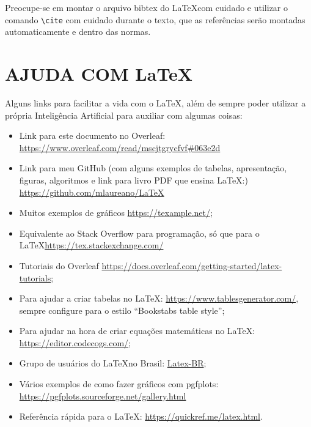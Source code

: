 \documentclass[12pt, openright, oneside, a4paper, english, brazilian]{abntex2}
\begin{document}
	Preocupe-se em montar o arquivo bibtex do \LaTeX com cuidado e utilizar o comando \verb|\cite| com cuidado durante o texto, que as referências serão montadas automaticamente e dentro das normas.

\chapter{AJUDA COM \LaTeX}
	Alguns links para facilitar a vida com o \LaTeX, além de sempre poder utilizar a própria Inteligência Artificial para auxiliar com algumas coisas:

	\begin{itemize}
		\item Link para este documento no Overleaf: \url{https://www.overleaf.com/read/mscjtgrycfvf#063e2d}
		\item Link para meu GitHub (com alguns exemplos de tabelas, apresentação, figuras, algoritmos e link para livro PDF que ensina \LaTeX:) \url{https://github.com/mlaureano/LaTeX}
		\item Muitos exemplos de gráficos \url{https://texample.net/};
		\item Equivalente ao Stack Overflow para programação, só que para o \LaTeX  \url{https://tex.stackexchange.com/}
		\item Tutoriais do Overleaf \url{https://docs.overleaf.com/getting-started/latex-tutorials};
		\item Para ajudar a criar tabelas no \LaTeX: \url{https://www.tablesgenerator.com/}, sempre configure para o estilo ``Bookstabs table style'';
		\item Para ajudar na hora de criar equações matemáticas no \LaTeX: \url{https://editor.codecogs.com/};
		\item Grupo de usuários do \LaTeX no Brasil: \href{https://groups.google.com/g/latex-br?pli=1}{Latex-BR};
		\item Vários exemplos de como fazer gráficos com pgfplots: \url{https://pgfplots.sourceforge.net/gallery.html}
        \item Referência rápida para o \LaTeX: \url{https://quickref.me/latex.html}.
	\end{itemize}
	



\postextual
\end{document}
